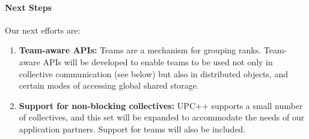 




\paragraph{Next Steps}


Our next efforts are:
\begin{enumerate}
\item \textbf{Team-aware APIs:} Teams are a mechanism for grouping ranks.
Team-aware APIs  will be developed to enable teams to be used not only in
collective communication (see below) but also in distributed objects,
and certain modes of accessing global shared storage.

\item \textbf{Support for non-blocking collectives:} UPC++ supports a small number
of collectives, and this set will be expanded to accommodate the needs of our
application partners. Support for teams will also be included.
	
	
\end{enumerate}
